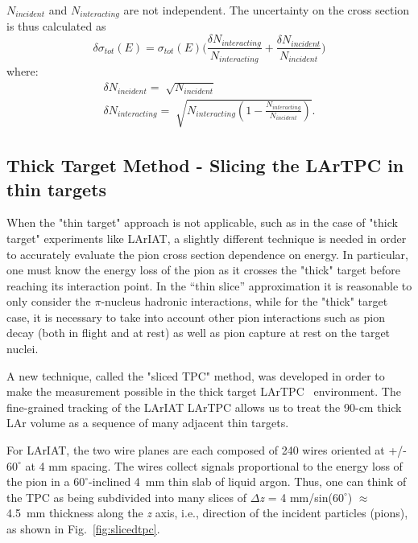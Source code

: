 $N_{incident}$ and $N_{interacting}$ are not independent.
The uncertainty on the cross section is thus calculated as 
\begin{equation}
\delta\sigma_{tot}(E) = \sigma_{tot}(E) \Big(\frac{\delta N_{interacting}}{N_{interacting}}+\frac{\delta N_{incident}}{N_{incident}}\Big) 
\end{equation}
where:
\begin{eqnarray}
\delta N_{incident} = \sqrt[]{N_{incident}} \\
\delta N_{interacting} = \sqrt[]{N_{interacting}(1-\frac{ N_{interacting}}{N_{incident}})}.
\end{eqnarray}

\subsection{Thick Target Method - Slicing the LArTPC in thin targets}

When the "thin target" approach is not applicable, such as in the case of "thick target" experiments like LArIAT, a slightly different technique is needed in order to accurately evaluate the pion cross section dependence on energy. In particular, one must know the energy loss of the pion as it crosses the "thick" target before reaching its interaction point. In the ``thin slice'' approximation it is reasonable to only consider the $\pi$-nucleus hadronic interactions, while for the "thick" target case, it is necessary to take into account other pion interactions such as pion decay (both in flight and at rest) as well as pion capture at rest on the target nuclei.

A new technique, called the "sliced TPC" method, was developed in order to make the measurement possible in the thick target LArTPC~\cite{myThesis} environment. The fine-grained tracking of the LArIAT LArTPC allows us to treat the 90-cm thick LAr volume as a sequence of many adjacent thin targets. 

For LArIAT, the two wire planes are each composed of 240 wires oriented at +/- $60^{\circ}$ at 4 mm spacing. The wires collect signals proportional to the energy loss of the pion in a $60^{\circ}$-inclined 4~mm thin slab of liquid argon. Thus, one can think of the TPC as being subdivided into many slices of $\Delta${\emph{z}} = 4 mm/sin($60^{\circ}$) $\approx$ 4.5~mm thickness along the {\emph{z}} axis, i.e., direction of the incident particles (pions), as shown in Fig.~\ref{fig:slicedtpc}. 

